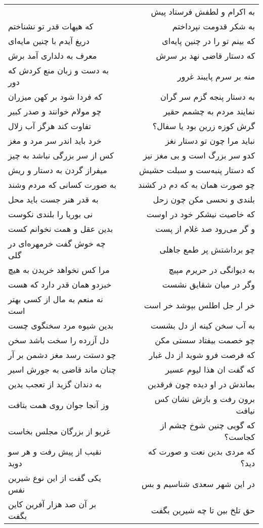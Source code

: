 \begin{center}
\begin{longtable}{l p{0.5cm} r}
&&
به اکرام و لطفش فرستاد پیش
\\
که هیهات قدر تو نشناختم
&&
به شکر قدومت نپرداختم
\\
دریغ آیدم با چنین مایه‌ای
&&
که بینم تو را در چنین پایه‌ای
\\
معرف به دلداری آمد برش
&&
که دستار قاضی نهد بر سرش
\\
به دست و زبان منع کردش که دور
&&
منه بر سرم پایبند غرور
\\
که فردا شود بر کهن میزران
&&
به دستار پنجه گزم سر گران
\\
چو مولام خوانند و صدر کبیر
&&
نمایند مردم به چشمم حقیر
\\
تفاوت کند هرگز آب زلال
&&
گرش کوزه زرین بود یا سفال؟
\\
خرد باید اندر سر مرد و مغز
&&
نباید مرا چون تو دستار نغز
\\
کس از سر بزرگی نباشد به چیز
&&
کدو سر بزرگ است و بی مغز نیز
\\
میفراز گردن به دستار و ریش
&&
که دستار پنبه‌ست و سبلت حشیش
\\
به صورت کسانی که مردم وشند
&&
چو صورت همان به که دم در کشند
\\
به قدر هنر جست باید محل
&&
بلندی و نحسی مکن چون زحل
\\
نی بوریا را بلندی نکوست
&&
که خاصیت نیشکر خود در اوست
\\
بدین عقل و همت نخوانم کست
&&
و گر می‌رود صد غلام از پست
\\
چه خوش گفت خرمهره‌ای در گلی
&&
چو برداشتش پر طمع جاهلی
\\
مرا کس نخواهد خریدن به هیچ
&&
به دیوانگی در حریرم مپیچ
\\
خبزدو همان قدر دارد که هست
&&
وگر در میان شقایق نشست
\\
نه منعم به مال از کسی بهتر است
&&
خر ار جل اطلس بپوشد خر است
\\
بدین شیوه مرد سخنگوی چست
&&
به آب سخن کینه از دل بشست
\\
دل آزرده را سخت باشد سخن
&&
چو خصمت بیفتاد سستی مکن
\\
چو دستت رسد مغز دشمن بر آر
&&
که فرصت فرو شوید از دل غبار
\\
چنان ماند قاضی به جورش اسیر
&&
که گفت ان هذا لیوم عسیر
\\
به دندان گزید از تعجب یدین
&&
بماندش در او دیده چون فرقدین
\\
وز آنجا جوان روی همت بتافت
&&
برون رفت و بازش نشان کس نیافت
\\
غریو از بزرگان مجلس بخاست
&&
که گویی چنین شوخ چشم از کجاست؟
\\
نقیب از پیش رفت و هر سو دوید
&&
که مردی بدین نعت و صورت که دید؟
\\
یکی گفت از این نوع شیرین نفس
&&
در این شهر سعدی شناسیم و بس
\\
بر آن صد هزار آفرین کاین بگفت
&&
حق تلخ بین تا چه شیرین بگفت
\\
\end{longtable}
\end{center}
